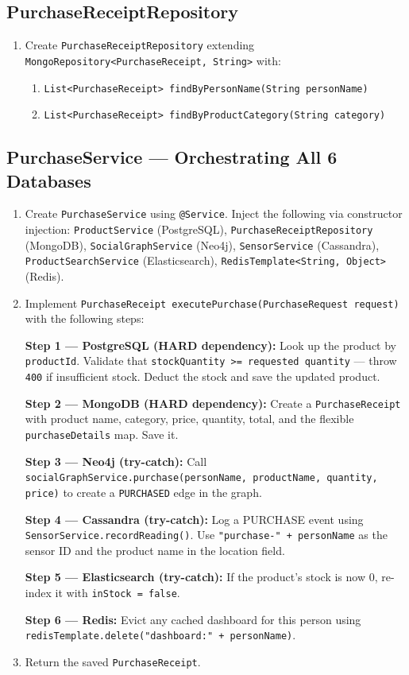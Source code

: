 \documentclass[a4paper]{article}
\begin{document}
\subsection*{PurchaseReceiptRepository}
\begin{enumerate}
  \item Create \texttt{PurchaseReceiptRepository} extending \texttt{MongoRepository<PurchaseReceipt, String>} with:
    \begin{enumerate}
      \item \texttt{List<PurchaseReceipt> findByPersonName(String personName)}
      \item \texttt{List<PurchaseReceipt> findByProductCategory(String category)}
    \end{enumerate}
\end{enumerate}

\subsection*{PurchaseService --- Orchestrating All 6 Databases}
\begin{enumerate}
  \item Create \texttt{PurchaseService} using \texttt{@Service}. Inject the following via constructor injection: \texttt{ProductService} (PostgreSQL), \texttt{PurchaseReceiptRepository} (MongoDB), \texttt{SocialGraphService} (Neo4j), \texttt{SensorService} (Cassandra), \texttt{ProductSearchService} (Elasticsearch), \texttt{RedisTemplate<String, Object>} (Redis).
  \item Implement \texttt{PurchaseReceipt executePurchase(PurchaseRequest request)} with the following steps:

    \textbf{Step 1 --- PostgreSQL (HARD dependency):} Look up the product by \texttt{productId}. Validate that \texttt{stockQuantity >= requested quantity} --- throw \texttt{400} if insufficient stock. Deduct the stock and save the updated product.

    \textbf{Step 2 --- MongoDB (HARD dependency):} Create a \texttt{PurchaseReceipt} with product name, category, price, quantity, total, and the flexible \texttt{purchaseDetails} map. Save it.

    \textbf{Step 3 --- Neo4j (try-catch):} Call \texttt{socialGraphService.purchase(personName, productName, quantity, price)} to create a \texttt{PURCHASED} edge in the graph.

    \textbf{Step 4 --- Cassandra (try-catch):} Log a PURCHASE event using \texttt{SensorService.recordReading()}. Use \texttt{"purchase-" + personName} as the sensor ID and the product name in the location field.

    \textbf{Step 5 --- Elasticsearch (try-catch):} If the product's stock is now 0, re-index it with \texttt{inStock = false}.

    \textbf{Step 6 --- Redis:} Evict any cached dashboard for this person using \texttt{redisTemplate.delete("dashboard:" + personName)}.

  \item Return the saved \texttt{PurchaseReceipt}.
\end{enumerate}
\end{document}
